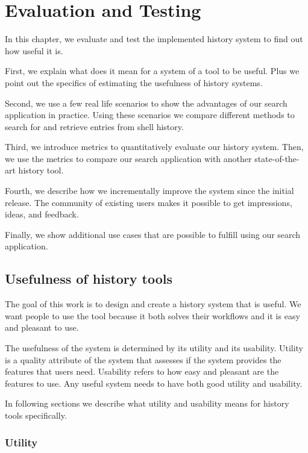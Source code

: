 
\chapter{Evaluation and Testing}

In this chapter, we evaluate and test the implemented history system to find out how useful it is.

First, we explain what does it mean for a system of a tool to be useful. Plus we point out the specifics of estimating the usefulness of history systems.

Second, we use a few real life scenarios to show the advantages of our search application in practice. Using these scenarios we compare different methods to search for and retrieve entries from shell history.

Third, we introduce metrics to quantitatively evaluate our history system. Then, we use the metrics to compare our search application with another state-of-the-art history tool.

Fourth, we describe how we incrementally improve the system since the initial release. The community of existing users makes it possible to get impressions, ideas, and feedback. 

Finally, we show additional use cases that are possible to fulfill using our search application. 

\section{Usefulness of history tools}

The goal of this work is to design and create a history system that is useful. 
We want people to use the tool because it both solves their workflows and it is easy and pleasant to use.

The usefulness of the system is determined by its utility and its usability.\cite{nielsen2012usability} Utility is a quality attribute of the system that assesses if the system provides the features that users need.\cite{nielsen2012usability} Usability refers to how easy and pleasant are the features to use. Any useful system needs to have both good utility and usability.

In following sections we describe what utility and usability means for history tools specifically.

\subsection{Utility}

